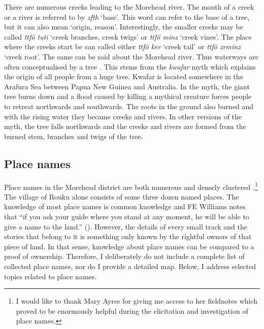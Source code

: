 There are numerous creeks leading to the Morehead river. The mouth of a creek or a river is referred to by \emph{zfth} `base'. This word can refer to the base of a tree, but it can also mean `origin, reason'. Interestingly, the smaller creeks may be called \emph{ttfö tuti} `creek branches, creek twigs' or \emph{ttfö minz} `creek vines'. The place where the creeks start be can called either \emph{ttfö ker} `creek tail' or \emph{ttfö zrminz} `creek root'. The same can be said about the Morehead river. Thus waterways are often conceptualised by a tree . This stems from the \emph{kwafar} myth which explains the origin of all people from a huge tree. Kwafar is located somewhere in the Arafura Sea between Papua New Guinea and Australia. In the myth, the giant tree burns down and a flood caused by killing a mythical creature forces people to retreat northwards and southwards. The roots in the ground also burned and with the rising water they became creeks and rivers. In other versions of the myth, the tree falls northwards and the creeks and rivers are formed from the burned stem, branches and twigs of the tree.

\subsection{Place names}\label{placenames}

Place names in the Morehead district are both numerous and densely clustered \citep[129]{Ayres:ws}.\footnote{I would like to thank Mary Ayres for giving me access to her fieldnotes which proved to be enormously helpful during the elicitation and investigation of place names.} The village of Rouku alone consists of some three dozen named places. The knowledge of most place names is common knowledge and FE Williams notes that ``if you ask your guide where you stand at any moment, he will be able to give a name to the land.'' (\citeyear[207]{Williams:1936transfly}). However, the details of every small track and the stories that belong to it is something only known by the rightful owners of that piece of land. In that sense, knowledge about place names can be compared to a proof of ownership. Therefore, I deliberately do not include a complete list of collected place names, nor do I provide a detailed map. Below, I address selected topics related to place names.%

